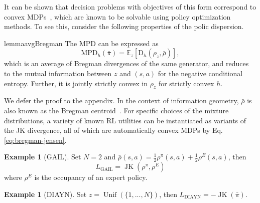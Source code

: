 \documentclass{article}
\theoremstyle{plain}
\theoremstyle{definition}
\newtheorem{example}[theorem]{Example}
\theoremstyle{remark}
\newcommand{\p}{\rho}  %
\begin{document}
It can be shown that decision problems with objectives of this form correspond to convex MDPs~\citep{zahavy2021reward}, which are known to be solvable using policy optimization methods. To see this, consider the following properties of the polic dispersion.
\begin{restatable}{lemma}{avgBregman}\label{eq:bregman-jensen}
    The MPD can be expressed as
    \begin{equation}
        \mathrm{MPD}_h(\bar\pi) = \mathbb{E}_z[\mathrm{D}_h(\rho_z,\bar\rho)],
    \end{equation}
    which is an average of Bregman divergences of the same generator, and reduces to the mutual information between $z$ and $(s,a)$ for the negative conditional entropy. Further, it is jointly strictly convex in $\rho_z$ for strictly convex $h$.
\end{restatable}
We defer the proof to the appendix. In the context of information geometry, $\bar\rho$ is also known as the Bregman centroid~\citep{nielsen2011burbea}. For specific choices of the mixture distributions, a variety of known RL utilities can be instantiated as variants of the JK divergence, all of which are automatically convex MDPs by Eq. \ref{eq:bregman-jensen}.

\begin{example}[GAIL]
    Set $N=2$ and $\bar\p(s,a)=\frac{1}{2}\p^\pi(s,a) + \frac{1}{2}\p^E(s,a)$, then 
    $$L_\mathrm{GAIL} = \operatorname{JK}(\rho^\pi, \rho^E)$$
    where $\p^E$ is the occupancy of an expert policy.
\end{example}

\begin{example}[DIAYN]
    Set $z=\operatorname{Unif}(\{1,...,N\})$, then 
    $L_\mathrm{DIAYN} = -\operatorname{JK}(\bar\pi)$.
\end{example}
\end{document}
